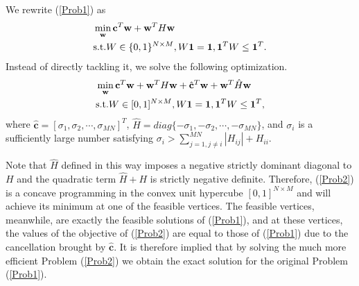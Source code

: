 We rewrite (\ref{Prob1}) as
\begin{equation}
\begin{split}
&\min_{\mathbf{w}}\mathbf{c}^{T}\mathbf{w}+\mathbf{w}^{T}H\mathbf{w}\\
&\textup{s.t.} W\in\{0,1\}^{N\times M}, W\mathbf{1}=\mathbf{1}, \mathbf{1}^{T}W\leq\mathbf{1}^{T}.
\end{split}
\end{equation}
Instead of directly tackling it, we solve the following optimization.
\begin{equation}
\label{Prob2}
\begin{split}
&\min_{\mathbf{w}}\mathbf{c}^{T}\mathbf{w}+\mathbf{w}^{T}H\mathbf{w}+\hat{\mathbf{c}}^{T}\mathbf{w}+\mathbf{w}^{T}\hat{H}\mathbf{w}\\
&\textup{s.t.}  W \in[0,1]^{N\times M}, W\mathbf{1}=\mathbf{1}, \mathbf{1}^{T}W\leq\mathbf{1}^{T},
\end{split}
\end{equation}
where $\hat{\mathbf{c}}=[\sigma_{1},\sigma_{2},\cdots,\sigma_{MN}]^{T}$, $\hat{H}=diag\{-\sigma_{1},-\sigma_{2},\cdots,-\sigma_{MN}\}$, and $\sigma_{i}$ is a sufficiently large number satisfying $\sigma_{i}>\sum^{MN}_{j=1,j\neq i}|H_{ij}|+H_{ii}$.

Note that $\hat{H}$ defined in this way imposes a negative strictly dominant diagonal to $H$ and the quadratic term $\hat{H}+H$ is strictly negative definite. Therefore, (\ref{Prob2}) is a concave programming in the convex unit hypercube $[0,1]^{N\times M}$ and will achieve its minimum at one of the feasible vertices. The feasible vertices, meanwhile, are exactly the feasible solutions of (\ref{Prob1}), and at these vertices, the values of the objective of (\ref{Prob2}) are equal to those of (\ref{Prob1}) due to the cancellation brought by $\hat{\mathbf{c}}$. It is therefore implied that by solving the much more efficient Problem (\ref{Prob2}) we obtain the exact solution for the original Problem (\ref{Prob1}).